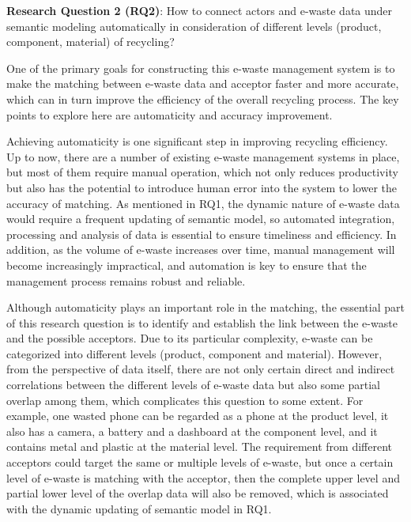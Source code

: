 \documentclass{article}
\numberwithin{equation}{section}
\begin{document}
\textbf{Research Question 2 (RQ2)}: How to connect actors and e-waste data under semantic modeling automatically in consideration of different levels (product, component, material) of recycling?

One of the primary goals for constructing this e-waste management system is to make the matching between e-waste data and acceptor faster and more accurate, which can in turn improve the efficiency of the overall recycling process.  The key points to explore here are automaticity and accuracy improvement. %

Achieving automaticity is one significant step in improving recycling efficiency. Up to now, there are a number of existing e-waste management systems in place, but most of them require manual operation, which not only reduces productivity but also has the potential to introduce human error into the system to lower the accuracy of matching. As mentioned in RQ1, the dynamic nature of e-waste data would require a frequent updating of semantic model, so automated integration, processing and analysis of data is essential to ensure timeliness and efficiency. In addition, as the volume of e-waste increases over time, manual management will become increasingly impractical, and automation is key to ensure that the management process remains robust and reliable.

Although automaticity plays an important role in the matching, the essential part of this research question is to identify and establish the link between the e-waste and the possible acceptors. Due to its particular complexity, e-waste can be categorized into different levels (product, component and material). However, from the perspective of data itself, there are not only certain direct and indirect correlations between the different levels of e-waste data but also some partial overlap among them, which complicates this question to some extent. For example, one wasted phone can be regarded as a phone at the product level, it also has a camera, a battery and a dashboard at the component level, and it contains metal and plastic at the material level. The requirement from different acceptors could target the same or multiple levels of e-waste, but once a certain level of e-waste is matching with the acceptor, then the complete upper level and partial lower level of the overlap data will also be removed, which is associated with the dynamic updating of semantic model in RQ1.
\end{document}
